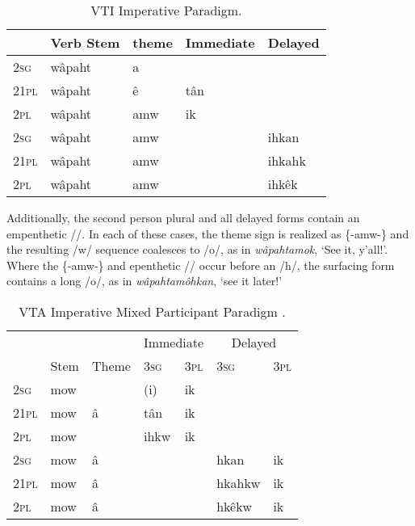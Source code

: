\begin{table}[h]
  \centering
  \begin{tabular}{lllll}
    \toprule
              & Verb Stem            & theme   & Immediate & Delayed \\
    \midrule
2\textsc{sg}  &   wâpaht          & a       &           &         \\
21\textsc{pl} &   wâpaht        & ê       & tân       &         \\
2\textsc{pl}  &   wâpaht            & amw     & ik         &         \\
\hline
\hline
2\textsc{sg}  & wâpaht            & amw     &           & ihkan    \\
21\textsc{pl} & wâpaht            & amw     &           & ihkahk   \\
2\textsc{pl}  & wâpaht            & amw     &           & ihkêk    \\
    \bottomrule
  \end{tabular}
  \caption{
    VTI Imperative Paradigm.  \citep[398]{Wolvengrey2011} \label{tab:vtiimppara}
  }
\end{table}

 Additionally, the second person plural and all delayed forms contain an empenthetic //. In each of these cases, the theme sign is realized as \{-amw-\} and the resulting /w/ sequence coalesces to /o/, as in \textit{wâpahtamok}, `See it, y'all!'. Where the \{-amw-\} and epenthetic // occur before an /h/, the surfacing form contains a long /o/, as in \textit{wâpahtamôhkan}, `see it later!'

\begin{table*}[h]
\centering
\begin{tabular}{llll|l||l|l}
    \toprule
                 &      &       & \multicolumn{2}{c}{Immediate}      & \multicolumn{2}{c}{Delayed}   \\
                 & Stem & Theme & 3\textsc{sg} & 3\textsc{pl} & 3\textsc{sg} & 3\textsc{pl}   \\ 
\midrule
2\textsc{sg}     & mow     &       & (i)           & ik          &              &                \\
21\textsc{pl}    & mow     & â      & tân           & ik          &              &                 \\
2\textsc{pl}     & mow     &       & ihkw          & ik          &              &                  \\
\hline
\hline
2\textsc{sg}     & mow    & â      &               &             & hkan          & ik                \\
21\textsc{pl}    & mow    & â      &               &             & hkahkw        & ik                 \\
2\textsc{pl}     & mow    & â      &               &             & hkêkw         & ik                  \\

    \bottomrule
  \end{tabular}
  \caption{
    VTA Imperative Mixed Participant Paradigm \citep[403]{Wolvengrey2011}. \label{tab:vtaimpmixed}
  }
\end{table*}


